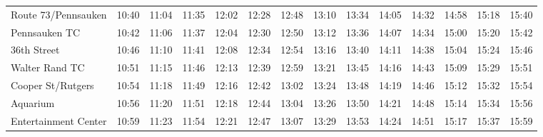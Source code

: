 \begin{center}
\begin{tabular}{@{}lrrrrrrrrrrrrr@{}}
Route 73/Pennsauken & 10:40 & 11:04 & 11:35 & 12:02 & 12:28 & 12:48 & 13:10 & 13:34 & 14:05 & 14:32 & 14:58 & 15:18 & 15:40 \\
Pennsauken TC & 10:42 & 11:06 & 11:37 & 12:04 & 12:30 & 12:50 & 13:12 & 13:36 & 14:07 & 14:34 & 15:00 & 15:20 & 15:42 \\
36th Street & 10:46 & 11:10 & 11:41 & 12:08 & 12:34 & 12:54 & 13:16 & 13:40 & 14:11 & 14:38 & 15:04 & 15:24 & 15:46 \\
Walter Rand TC & 10:51 & 11:15 & 11:46 & 12:13 & 12:39 & 12:59 & 13:21 & 13:45 & 14:16 & 14:43 & 15:09 & 15:29 & 15:51 \\
Cooper St/Rutgers & 10:54 & 11:18 & 11:49 & 12:16 & 12:42 & 13:02 & 13:24 & 13:48 & 14:19 & 14:46 & 15:12 & 15:32 & 15:54 \\
Aquarium & 10:56 & 11:20 & 11:51 & 12:18 & 12:44 & 13:04 & 13:26 & 13:50 & 14:21 & 14:48 & 15:14 & 15:34 & 15:56 \\
Entertainment Center & 10:59 & 11:23 & 11:54 & 12:21 & 12:47 & 13:07 & 13:29 & 13:53 & 14:24 & 14:51 & 15:17 & 15:37 & 15:59 \\
\bottomrule\end{tabular}\end{center}
